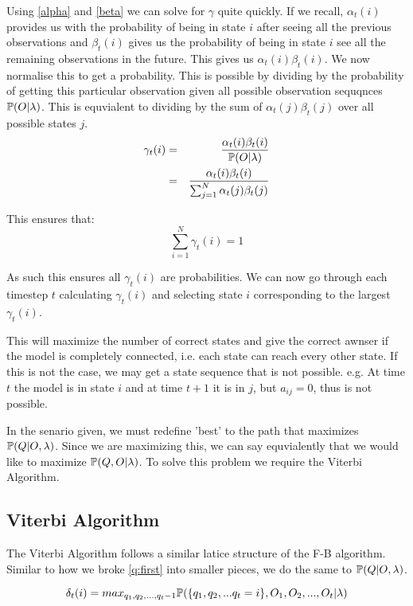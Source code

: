 Using \ref{alpha} and \ref{beta} we can solve for $\gamma$ quite quickly. If we recall, $\alpha_t(i)$ provides us with the probability of being in state $i$ after seeing all the previous observations and $\beta_t(i)$ gives us the probability of being in state $i$ see all the remaining observations in the future. This gives us $\alpha_t(i) \beta_t(i)$. We now normalise this to get a probability. This is possible by dividing by the probability of getting this particular observation given all possible observation sequqnces $\mathbb{P} (O|\lambda)$. This is equvialent to dividing by the sum of $\alpha_t(j) \beta_t(j)$ over all possible states $j$.
\begin{eqnarray}
    \gamma_t(i) & = &  \dfrac{\alpha_t(i) \beta_t(i)}{\mathbb{P} (O|\lambda)} \\
                & = &  \dfrac{\alpha_t(i) \beta_t(i)}{\sum_{j=1}^N \alpha_t(j) \beta_t(j)}
\end{eqnarray}

This ensures that:
\begin{equation}
    \sum_{i=1}^N \gamma_t(i) = 1
\end{equation}

As such this ensures all $\gamma_t(i)$ are probabilities. We can now go through each timestep $t$ calculating $\gamma_t(i)$ and selecting state $i$ corresponding to the largest $\gamma_t(i)$.


This will maximize the number of correct states and give the correct awnser if the model is completely connected, i.e. each state can reach every other state. If this is not the case, we may get a state sequence that is not possible. e.g. At time $t$ the model is in state $i$ and at time $t+1$ it is in $j$, but $a_{ij} = 0$, thus is not possible.

In the senario given, we must redefine 'best' to the path that maximizes $\mathbb{P} (Q | O, \lambda)$. Since we are maximizing this, we can say equvialently that we would like to maximize $\mathbb{P} (Q, O | \lambda)$. To solve this problem we require the Viterbi Algorithm.


\subsection{Viterbi Algorithm}
The Viterbi Algorithm follows a similar latice structure of the F-B algorithm. Similar to how we broke \ref{q:first} into smaller pieces, we do the same to $\mathbb{P} (Q | O, \lambda)$.

\begin{equation}
    \delta_t(i)  = max_{q_1,q_2,...,q_t-1} \mathbb{P} (\{q_1,q_2,...q_t=i\},{O_1,O_2,...,O_t}|\lambda) 
\end{equation}


